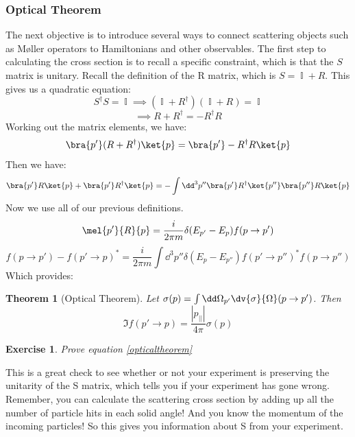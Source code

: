 \documentclass{article}
\newtheorem{exercise}{Exercise}[section]
\DeclareMathOperator{\II}{\mathbb{I}}
\newtheorem{thm}{Theorem}
\begin{document}
\subsubsection{Optical Theorem}
The next objective is to introduce several ways to connect scattering objects such as M\o ller operators to Hamiltonians and other observables. The first step to calculating the cross section is to recall a specific constraint, which is that the $S$ matrix is unitary. Recall the definition of the R matrix, which is $S = \II + R$. This gives us a quadratic equation:
\[S^\dagger S = \II \implies (\II + R^\dagger)(\II + R) = \II\]
\[\implies R+R^\dagger = -R^\dagger R\]
Working out the matrix elements, we have:
\[\bra{p'}(R+R^\dagger)\ket{p} = \bra{p'}-R^\dagger R \ket{p}\]
Then we have:
\[\bra{p'}R\ket{p}+\bra{p'}R^\dagger \ket{p} = -\int\dd^3 p'' \bra{p'}R^{\dagger} \ket{p''}\bra{p''}R\ket{p}\]
Now we use all of our previous definitions.
\[\mel{p'}{R}{p}=\frac{i}{2\pi m}\delta(E_{p'}-E_p) f(p\to p')\]
\begin{equation} f(p\to p') - f(p'\to p)^* = \frac{i}{2\pi m} \int \dd^3 p'' \delta(E_p-E_{p''}) f(p'\to p'')^* f(p\to p'')\end{equation}
Which provides:
\begin{thm}[Optical Theorem] Let $\sigma(p) = \int \dd \Omega_{p'}\dv{\sigma}{\Omega}(p\to p')$. Then
\begin{equation}\label{opticaltheorem}\Im f(p'\to p) = \frac{|p_{||}|}{4\pi}\sigma(p)\end{equation}
\end{thm}
\begin{exercise} Prove equation \eqref{opticaltheorem}
\end{exercise}
This is a great check to see whether or not your experiment is preserving the unitarity of the S matrix, which tells you if your experiment has gone wrong. Remember, you can calculate the scattering cross section by adding up all the number of particle hits in each solid angle! And you know the momentum of the incoming particles! So this gives you information about S from your experiment.
\end{document}
